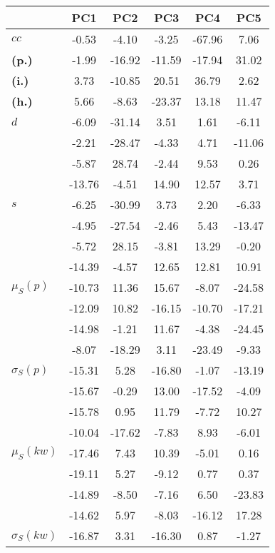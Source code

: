 \begin{table}[h!]
\begin{center}
\begin{tabular}{| l || c | c | c | c | c |}\hline
 & {\bf PC1} & {\bf PC2} & {\bf PC3} & {\bf PC4} & {\bf PC5} \\\hline\hline
{\bf $cc$} & -0.53 & -4.10 & -3.25 & -67.96 & 7.06 \\
{\bf (p.)} & -1.99 & -16.92 & -11.59 & -17.94 & 31.02 \\
{\bf (i.)} & 3.73 & -10.85 & 20.51 & 36.79 & 2.62 \\
{\bf (h.)} & 5.66 & -8.63 & -23.37 & 13.18 & 11.47 \\\hline
{\bf $d$} & -6.09 & -31.14 & 3.51 & 1.61 & -6.11 \\
{\bf } & -2.21 & -28.47 & -4.33 & 4.71 & -11.06 \\
{\bf } & -5.87 & 28.74 & -2.44 & 9.53 & 0.26 \\
{\bf } & -13.76 & -4.51 & 14.90 & 12.57 & 3.71 \\\hline
{\bf $s$} & -6.25 & -30.99 & 3.73 & 2.20 & -6.33 \\
{\bf } & -4.95 & -27.54 & -2.46 & 5.43 & -13.47 \\
 & -5.72  & 28.15  & -3.81  & 13.29  & -0.20 \\
 & -14.39  & -4.57  & 12.65  & 12.81  & 10.91 \\\hline
$\mu_S(p)$ & -10.73  & 11.36  & 15.67  & -8.07  & -24.58 \\
 & -12.09  & 10.82  & -16.15  & -10.70  & -17.21 \\
 & -14.98  & -1.21  & 11.67  & -4.38  & -24.45 \\
 & -8.07  & -18.29  & 3.11  & -23.49  & -9.33 \\\hline
$\sigma_S(p)$ & -15.31  & 5.28  & -16.80  & -1.07  & -13.19 \\
 & -15.67  & -0.29  & 13.00  & -17.52  & -4.09 \\
 & -15.78  & 0.95  & 11.79  & -7.72  & 10.27 \\
 & -10.04  & -17.62  & -7.83  & 8.93  & -6.01 \\\hline
$\mu_S(kw)$ & -17.46  & 7.43  & 10.39  & -5.01  & 0.16 \\
 & -19.11  & 5.27  & -9.12  & 0.77  & 0.37 \\
 & -14.89  & -8.50  & -7.16  & 6.50  & -23.83 \\
 & -14.62  & 5.97  & -8.03  & -16.12  & 17.28 \\\hline
$\sigma_S(kw)$ & -16.87  & 3.31  & -16.30  & 0.87  & -1.27 \\

\end{tabular}
\end{center}
\end{table}
